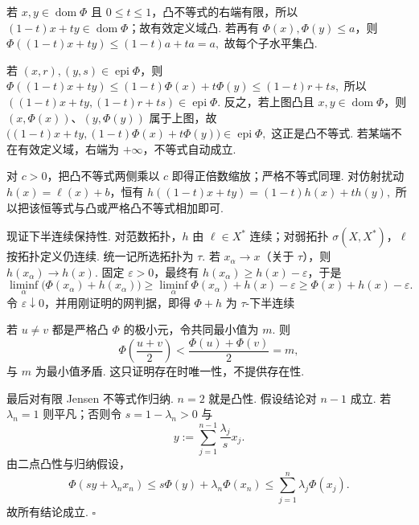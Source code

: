 \begin{FAProof}
若 \(\displaystyle x,y\in\operatorname{dom}\Phi\) 且 \(\displaystyle0\leqslant t\leqslant1\)，凸不等式的右端有限，所以 \(\displaystyle(1-t)x+ty\in\operatorname{dom}\Phi\)；故有效定义域凸. 若再有 \(\displaystyle\Phi(x),\Phi(y)\leqslant a\)，则
\(\displaystyle \Phi((1-t)x+ty) \leqslant (1-t)a+ta =a,\)
故每个子水平集凸.

若 \(\displaystyle(x,r),(y,s)\in\operatorname{epi}\Phi\)，则
\(\displaystyle \Phi((1-t)x+ty) \leqslant (1-t)\Phi(x)+t\Phi(y) \leqslant (1-t)r+ts,\)
所以 \(\displaystyle((1-t)x+ty,(1-t)r+ts)\in\operatorname{epi}\Phi\). 反之，若上图凸且 \(\displaystyle x,y\in\operatorname{dom}\Phi\)，则 \(\displaystyle(x,\Phi(x))\)、\(\displaystyle(y,\Phi(y))\) 属于上图，故
\(\displaystyle \bigl((1-t)x+ty,(1-t)\Phi(x)+t\Phi(y)\bigr) \in \operatorname{epi}\Phi,\)
这正是凸不等式. 若某端不在有效定义域，右端为 \(\displaystyle+\infty\)，不等式自动成立.

对 \(\displaystyle c>0\)，把凸不等式两侧乘以 \(\displaystyle c\) 即得正倍数缩放；严格不等式同理. 对仿射扰动 \(\displaystyle h(x)=\ell(x)+b\)，恒有
\(\displaystyle h((1-t)x+ty) = (1-t)h(x)+th(y),\)
所以把该恒等式与凸或严格凸不等式相加即可.

现证下半连续保持性. 对范数拓扑，\(\displaystyle h\) 由 \(\displaystyle\ell\in X^*\) 连续；对弱拓扑 \(\displaystyle\sigma(X,X^*)\)，\(\displaystyle\ell\) 按拓扑定义仍连续. 统一记所选拓扑为 \(\displaystyle\tau\). 若 \(\displaystyle x_\alpha\to x\)（关于 \(\displaystyle\tau\)），则 \(\displaystyle h(x_\alpha)\to h(x)\). 固定 \(\displaystyle\varepsilon>0\)，最终有 \(\displaystyle h(x_\alpha)\geqslant h(x)-\varepsilon\)，于是
\[
\liminf_\alpha\bigl(\Phi(x_\alpha)+h(x_\alpha)\bigr)
\geqslant
\liminf_\alpha\Phi(x_\alpha)+h(x)-\varepsilon
\geqslant
\Phi(x)+h(x)-\varepsilon.
\]
令 \(\displaystyle\varepsilon\downarrow0\)，并用刚证明的网判据，即得 \(\displaystyle\Phi+h\) 为 \(\displaystyle\tau\)-下半连续

若 \(\displaystyle u\neq v\) 都是严格凸 \(\displaystyle\Phi\) 的极小元，令共同最小值为 \(\displaystyle m\). 则
\[
\Phi\!\left(\frac{u+v}{2}\right)
<
\frac{\Phi(u)+\Phi(v)}{2}
=m,
\]
与 \(\displaystyle m\) 为最小值矛盾. 这只证明存在时唯一性，不提供存在性.

最后对有限 Jensen 不等式作归纳. \(\displaystyle n=2\) 就是凸性. 假设结论对 \(\displaystyle n-1\) 成立. 若 \(\displaystyle\lambda_n=1\) 则平凡；否则令 \(\displaystyle s=1-\lambda_n>0\) 与
\[
y
:=
\sum_{j=1}^{n-1}\frac{\lambda_j}{s}x_j.
\]
由二点凸性与归纳假设，
\[
\Phi(sy+\lambda_nx_n)
\leqslant
s\Phi(y)+\lambda_n\Phi(x_n)
\leqslant
\sum_{j=1}^n\lambda_j\Phi(x_j).
\]
故所有结论成立.
\hfill\(\square\)

\end{FAProof}

